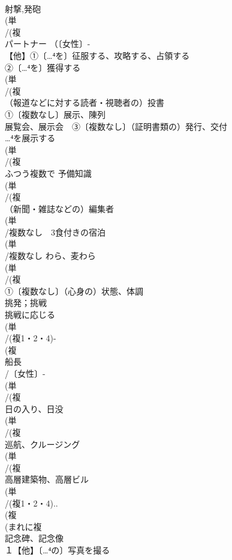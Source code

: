 \documentclass[8pt]{extreport}
\begin{document}
\begin{CJK}{UTF8}{min}
\\	射撃,発砲 
\\	(単
\\	/(複
\\	パートナー （〔女性〕-
\\	【他】①〔…⁴を〕征服する、攻略する、占領する 
\\	②〔…⁴を〕獲得する
\\	(単
\\	/(複
\\	（報道などに対する読者・視聴者の）投書 
\\	①〔複数なし〕展示、陳列　
\\	展覧会、展示会　③〔複数なし〕（証明書類の）発行、交付 
\\	…⁴を展示する
\\	(単
\\	/(複
\\	ふつう複数で 予備知識 
\\	(単
\\	/(複
\\	（新聞・雑誌などの）編集者 
\\	(単
\\	/複数なし　3食付きの宿泊 
\\	(単
\\	/複数なし わら、麦わら 
\\	(単
\\	/(複
\\	①〔複数なし〕（心身の）状態、体調 
\\	挑発；挑戦 
\\	挑戦に応じる 
\\	(単
\\	/(複1・2・4)-
\\	(複
\\	船長 
\\	/〔女性〕-
\\	(単
\\	/(複
\\	日の入り、日没 
\\	(単
\\	/(複
\\	巡航、クルージング 
\\	(単
\\	/(複
\\	高層建築物、高層ビル 
\\	(単
\\	/(複1・2・4)..
\\	(複
\\	(まれに複
\\	記念碑、記念像 
\\	１【他】〔…⁴の〕写真を撮る 

\end{CJK}
\end{document}
